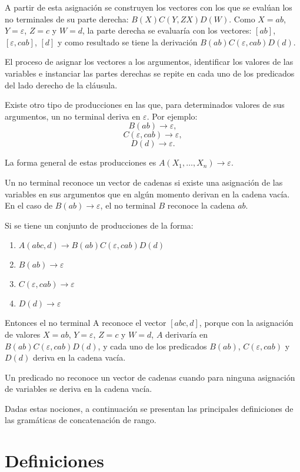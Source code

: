 A partir de esta  asignación se construyen los vectores con los que se evalúan los no terminales 
de su parte derecha: $B(X)C(Y,ZX)D(W)$. Como $X=ab$, $Y=\varepsilon$, $Z=c$ y $W=d$, la parte derecha se evaluaría con los vectores: $[ab]$, $[\varepsilon, cab]$, $[d]$ y como resultado se tiene la derivación $B(ab)C(\varepsilon,cab)D(d)$.

El proceso de asignar los vectores a los argumentos, identificar los valores de las variables e instanciar las partes derechas se repite en cada uno de los predicados del lado derecho de la cláusula.

Existe otro tipo de producciones en las que, para determinados valores de sus argumentos, un no terminal deriva en $\varepsilon$. Por ejemplo: 
$$B(ab)\to \varepsilon,$$
$$C(\varepsilon,cab)\to \varepsilon,$$
$$D(d)\to \varepsilon.$$

La forma general de estas producciones es $A(X_1,\ldots, X_n)\rightarrow \varepsilon$.

Un no terminal reconoce un vector de cadenas si existe una asignación de las variables 
en sus argumentos que en algún momento derivan en la cadena vacía. En el caso de $B(ab)\to \varepsilon$, 
el no terminal $B$ reconoce la cadena $ab$.

Si se tiene un conjunto de producciones de la forma:
\begin{enumerate}
    \item $A(abc,d)\to B(ab)C(\varepsilon,cab)D(d)$
    \item $B(ab)\to \varepsilon$
    \item $C(\varepsilon,cab)\to \varepsilon$
    \item $D(d)\to \varepsilon$
\end{enumerate}
Entonces el no terminal A reconoce el vector $[abc,d]$, porque con la asignación de valores $X=ab$, $Y=\varepsilon$, $Z=c$ y $W=d$, $A$ derivaría en $B(ab)C(\varepsilon,cab)D(d)$,
y cada uno de los predicados $B(ab)$, $C(\varepsilon,cab)$ y $D(d)$ deriva en la cadena vacía.

Un predicado no reconoce un vector de cadenas cuando para ninguna asignación de variables se deriva en la cadena vacía.

Dadas estas nociones, a continuación se presentan las principales definiciones de las gramáticas de concatenación de rango.

\section{Definiciones}

